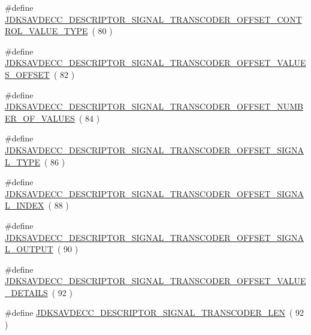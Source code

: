\begin{DoxyCompactItemize}
\item 
\#define \hyperlink{group__descriptor__transcoder_ga34c854deacafdd0e1f9bee485ef5a623}{J\+D\+K\+S\+A\+V\+D\+E\+C\+C\+\_\+\+D\+E\+S\+C\+R\+I\+P\+T\+O\+R\+\_\+\+S\+I\+G\+N\+A\+L\+\_\+\+T\+R\+A\+N\+S\+C\+O\+D\+E\+R\+\_\+\+O\+F\+F\+S\+E\+T\+\_\+\+C\+O\+N\+T\+R\+O\+L\+\_\+\+V\+A\+L\+U\+E\+\_\+\+T\+Y\+PE}~( 80 )
\item 
\#define \hyperlink{group__descriptor__transcoder_ga013e5dbf22fe122788bf137135a43de2}{J\+D\+K\+S\+A\+V\+D\+E\+C\+C\+\_\+\+D\+E\+S\+C\+R\+I\+P\+T\+O\+R\+\_\+\+S\+I\+G\+N\+A\+L\+\_\+\+T\+R\+A\+N\+S\+C\+O\+D\+E\+R\+\_\+\+O\+F\+F\+S\+E\+T\+\_\+\+V\+A\+L\+U\+E\+S\+\_\+\+O\+F\+F\+S\+ET}~( 82 )
\item 
\#define \hyperlink{group__descriptor__transcoder_ga56c758dac7920b4fc1d1c34ea753db5f}{J\+D\+K\+S\+A\+V\+D\+E\+C\+C\+\_\+\+D\+E\+S\+C\+R\+I\+P\+T\+O\+R\+\_\+\+S\+I\+G\+N\+A\+L\+\_\+\+T\+R\+A\+N\+S\+C\+O\+D\+E\+R\+\_\+\+O\+F\+F\+S\+E\+T\+\_\+\+N\+U\+M\+B\+E\+R\+\_\+\+O\+F\+\_\+\+V\+A\+L\+U\+ES}~( 84 )
\item 
\#define \hyperlink{group__descriptor__transcoder_ga195494c9b869d40b030ee40f35cc50b2}{J\+D\+K\+S\+A\+V\+D\+E\+C\+C\+\_\+\+D\+E\+S\+C\+R\+I\+P\+T\+O\+R\+\_\+\+S\+I\+G\+N\+A\+L\+\_\+\+T\+R\+A\+N\+S\+C\+O\+D\+E\+R\+\_\+\+O\+F\+F\+S\+E\+T\+\_\+\+S\+I\+G\+N\+A\+L\+\_\+\+T\+Y\+PE}~( 86 )
\item 
\#define \hyperlink{group__descriptor__transcoder_gaf83ef74ba6e31d779362c111dccb3346}{J\+D\+K\+S\+A\+V\+D\+E\+C\+C\+\_\+\+D\+E\+S\+C\+R\+I\+P\+T\+O\+R\+\_\+\+S\+I\+G\+N\+A\+L\+\_\+\+T\+R\+A\+N\+S\+C\+O\+D\+E\+R\+\_\+\+O\+F\+F\+S\+E\+T\+\_\+\+S\+I\+G\+N\+A\+L\+\_\+\+I\+N\+D\+EX}~( 88 )
\item 
\#define \hyperlink{group__descriptor__transcoder_gacf3bb2161836662b286f4715b22046e3}{J\+D\+K\+S\+A\+V\+D\+E\+C\+C\+\_\+\+D\+E\+S\+C\+R\+I\+P\+T\+O\+R\+\_\+\+S\+I\+G\+N\+A\+L\+\_\+\+T\+R\+A\+N\+S\+C\+O\+D\+E\+R\+\_\+\+O\+F\+F\+S\+E\+T\+\_\+\+S\+I\+G\+N\+A\+L\+\_\+\+O\+U\+T\+P\+UT}~( 90 )
\item 
\#define \hyperlink{group__descriptor__transcoder_ga5e538ac42f05d94a2cf5d06cd2f248e7}{J\+D\+K\+S\+A\+V\+D\+E\+C\+C\+\_\+\+D\+E\+S\+C\+R\+I\+P\+T\+O\+R\+\_\+\+S\+I\+G\+N\+A\+L\+\_\+\+T\+R\+A\+N\+S\+C\+O\+D\+E\+R\+\_\+\+O\+F\+F\+S\+E\+T\+\_\+\+V\+A\+L\+U\+E\+\_\+\+D\+E\+T\+A\+I\+LS}~( 92 )
\item 
\#define \hyperlink{group__descriptor__transcoder_gad7874b3634edd5a908909a5659dd899c}{J\+D\+K\+S\+A\+V\+D\+E\+C\+C\+\_\+\+D\+E\+S\+C\+R\+I\+P\+T\+O\+R\+\_\+\+S\+I\+G\+N\+A\+L\+\_\+\+T\+R\+A\+N\+S\+C\+O\+D\+E\+R\+\_\+\+L\+EN}~( 92 )
\end{DoxyCompactItemize}
